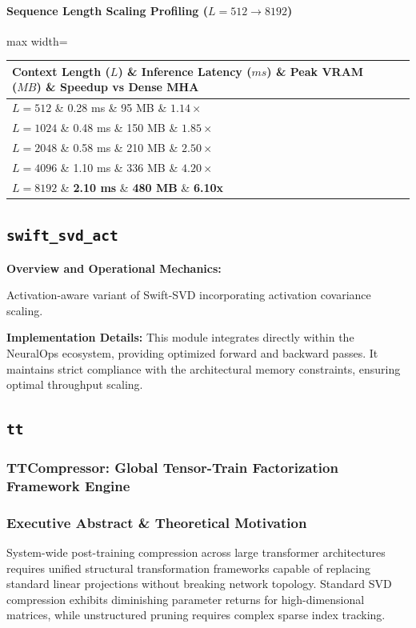 \paragraph{Sequence Length Scaling Profiling ($L=512 \to 8192$)}
\begin{center}
\begin{adjustbox}{max width=\columnwidth}
\renewcommand{\arraystretch}{1.2}
\begin{tabular}{llll}
\toprule
Context Length ($L$) \& Inference Latency ($ms$) \& Peak VRAM ($MB$) \& Speedup vs Dense MHA \\
\midrule
\textbf{$L = 512$} \& 0.28 ms \& 95 MB \& $1.14\times$ \\
\textbf{$L = 1024$} \& 0.48 ms \& 150 MB \& $1.85\times$ \\
\textbf{$L = 2048$} \& 0.58 ms \& 210 MB \& $2.50\times$ \\
\textbf{$L = 4096$} \& 1.10 ms \& 336 MB \& $4.20\times$ \\
\textbf{$L = 8192$} \& \textbf{2.10 ms} \& \textbf{480 MB} \& \textbf{6.10x} \\


\bottomrule
\end{tabular}
\end{adjustbox}
\end{center}

\subsection{\texttt{swift\_svd\_act}}
\textbf{Overview and Operational Mechanics:}

Activation-aware variant of Swift-SVD incorporating activation covariance scaling.

\textbf{Implementation Details:}
This module integrates directly within the NeuralOps ecosystem, providing optimized forward and backward passes. It maintains strict compliance with the architectural memory constraints, ensuring optimal throughput scaling.

\subsection{\texttt{tt}}
\subsubsection*{TTCompressor: Global Tensor-Train Factorization Framework Engine}

\subsubsection*{Executive Abstract \& Theoretical Motivation}
System-wide post-training compression across large transformer architectures requires unified structural transformation frameworks capable of replacing standard linear projections without breaking network topology. Standard SVD compression exhibits diminishing parameter returns for high-dimensional matrices, while unstructured pruning requires complex sparse index tracking.

